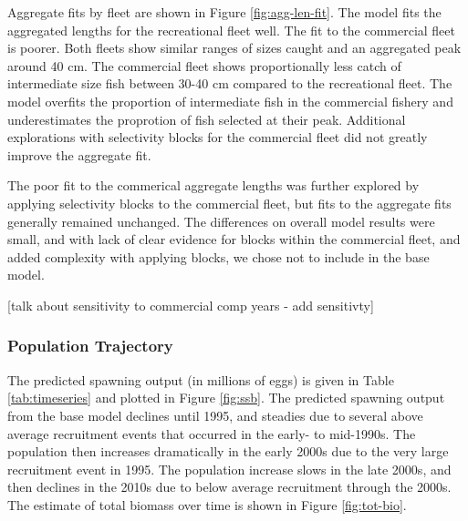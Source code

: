 \documentclass[11pt,
  english,
  a4paper,
]{article}
\begin{document}
Aggregate fits by fleet are shown in Figure \ref{fig:agg-len-fit}. The model fits the aggregated lengths for the recreational fleet well. The fit to the commercial fleet is poorer. Both fleets show similar ranges of sizes caught and an aggregated peak around 40 cm. The commercial fleet shows proportionally less catch of intermediate size fish between 30-40 cm compared to the recreational fleet. The model overfits the proportion of intermediate fish in the commercial fishery and underestimates the proprotion of fish selected at their peak. Additional explorations with selectivity blocks for the commercial fleet did not greatly improve the aggregate fit.

\leavevmode\tagmcend\tagstructend\par


The poor fit to the commerical aggregate lengths was further explored by applying selectivity blocks to the commercial fleet, but fits to the aggregate fits generally remained unchanged. The differences on overall model results were small, and with lack of clear evidence for blocks within the commercial fleet, and added complexity with applying blocks, we chose not to include in the base model.

\leavevmode\tagmcend\tagstructend\par


{[}talk about sensitivity to commercial comp years - add sensitivty{]}

\leavevmode\tagmcend\tagstructend\par


\hypertarget{population-trajectory}{%
\subsubsection{Population Trajectory}\label{population-trajectory}}

\leavevmode\tagmcend\tagstructend


The predicted spawning output (in millions of eggs) is given in Table \ref{tab:timeseries} and plotted in Figure \ref{fig:ssb}. The predicted spawning output from the base model declines until 1995, and steadies due to several above average recruitment events that occurred in the early- to mid-1990s. The population then increases dramatically in the early 2000s due to the very large recruitment event in 1995. The population increase slows in the late 2000s, and then declines in the 2010s due to below average recruitment through the 2000s. The estimate of total biomass over time is shown in Figure \ref{fig:tot-bio}.
\end{document}
